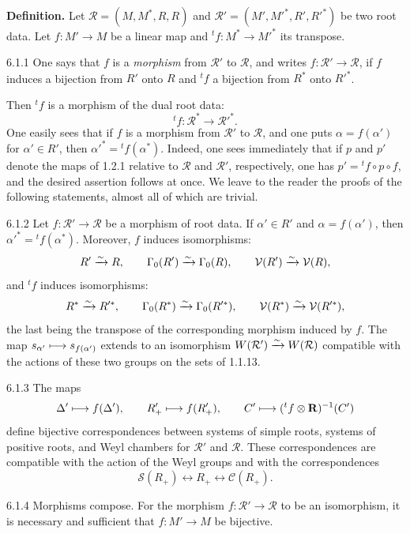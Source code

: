 \label{XXI.sec.6}
 \textbf{Definition.} Let $\mathcal R=(M,M^*,R,R)$ and $\mathcal R'=(M',M'^*,R',R'^*)$ be two root data. Let $f:M'\to M$ be a linear map and ${}^tf:M^*\to M'^*$ its transpose.
\begin{definition}{6.1.1}\label{XXI.6.1.1}
One says that $f$ is a \emph{morphism} from $\mathcal R'$ to $\mathcal R$, and writes $f:\mathcal R'\to\mathcal R$, if $f$ induces a bijection from $R'$ onto $R$ and ${}^tf$ a bijection from $R^*$ onto $R'^*$.
\end{definition}
Then ${}^tf$ is a morphism of the dual root data:
\[
{}^tf:\mathcal R^*\to\mathcal R'^*.
\]
One easily sees that if $f$ is a morphism from $\mathcal R'$ to $\mathcal R$, and one puts $\alpha=f(\alpha')$ for $\alpha'\in R'$, then $\alpha'^*={}^tf(\alpha^*)$. Indeed, one sees immediately that if $p$ and $p'$ denote the maps of 1.2.1 relative to $\mathcal R$ and $\mathcal R'$, respectively, one has $p'={}^tf\circ p\circ f$, and the desired assertion follows at once. We leave to the reader the proofs of the following statements, almost all of which are trivial.
\begin{proposition}{6.1.2}\label{XXI.6.1.2}
Let $f:\mathcal R'\to\mathcal R$ be a morphism of root data. If $\alpha'\in R'$ and $\alpha=f(\alpha')$, then $\alpha'^*={}^tf(\alpha^*)$. Moreover, $f$ induces isomorphisms:
\[
R'\xrightarrow{\sim} R,\qquad\Gamma_0(R')\xrightarrow{\sim}\Gamma_0(R),\qquad\mathcal V(R')\xrightarrow{\sim}\mathcal V(R),
\]
and ${}^tf$ induces isomorphisms:
\[
R^*\xrightarrow{\sim} R'^*,\qquad\Gamma_0(R^*)\xrightarrow{\sim}\Gamma_0(R'^*),\qquad\mathcal V(R^*)\xrightarrow{\sim}\mathcal V(R'^*),
\]
the last being the transpose of the corresponding morphism induced by $f$. The map $s_{\alpha'}\longmapsto s_{f(\alpha')}$ extends to an isomorphism $W(\mathcal R')\xrightarrow{\sim} W(\mathcal R)$ compatible with the actions of these two groups on the sets of 1.1.13.
\end{proposition}
\begin{proposition}{6.1.3}\label{XXI.6.1.3}
The maps
\[
\Delta'\longmapsto f(\Delta'),\qquad R'_+\longmapsto f(R'_+),\qquad C'\longmapsto({}^tf\otimes\mathbf{R})^{-1}(C')
\]
define bijective correspondences between systems of simple roots, systems of positive roots, and Weyl chambers for $\mathcal R'$ and $\mathcal R$. These correspondences are compatible with the action of the Weyl groups and with the correspondences
\[
\mathcal S(R_+)\leftrightarrow R_+\leftrightarrow\mathcal C(R_+).
\]
\end{proposition}
\begin{lemma}{6.1.4}\label{XXI.6.1.4}
Morphisms compose. For the morphism $f:\mathcal R'\to\mathcal R$ to be an isomorphism, it is necessary and sufficient that $f:M'\to M$ be bijective.
\end{lemma}

